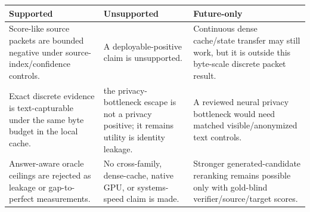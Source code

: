 \documentclass{article}
\begin{document}
\begingroup\small
\begin{longtable}[]{@{}lll@{}}
\toprule
\begin{minipage}[b]{0.30\columnwidth}\raggedright
Supported\strut
\end{minipage} & \begin{minipage}[b]{0.30\columnwidth}\raggedright
Unsupported\strut
\end{minipage} & \begin{minipage}[b]{0.30\columnwidth}\raggedright
Future-only\strut
\end{minipage}\tabularnewline
\midrule
\endhead
\begin{minipage}[t]{0.30\columnwidth}\raggedright
Score-like source packets are bounded negative under
source-index/confidence controls.\strut
\end{minipage} & \begin{minipage}[t]{0.30\columnwidth}\raggedright
A deployable-positive claim is unsupported.\strut
\end{minipage} & \begin{minipage}[t]{0.30\columnwidth}\raggedright
Continuous dense cache/state transfer may still work, but it is outside
this byte-scale discrete packet result.\strut
\end{minipage}\tabularnewline
\begin{minipage}[t]{0.30\columnwidth}\raggedright
Exact discrete evidence is text-capturable under the same byte budget in
the local cache.\strut
\end{minipage} & \begin{minipage}[t]{0.30\columnwidth}\raggedright
the privacy-bottleneck escape is not a privacy positive; it remains
utility is identity leakage.\strut
\end{minipage} & \begin{minipage}[t]{0.30\columnwidth}\raggedright
A reviewed neural privacy bottleneck would need matched
visible/anonymized text controls.\strut
\end{minipage}\tabularnewline
\begin{minipage}[t]{0.30\columnwidth}\raggedright
Answer-aware oracle ceilings are rejected as leakage or gap-to-perfect
measurements.\strut
\end{minipage} & \begin{minipage}[t]{0.30\columnwidth}\raggedright
No cross-family, dense-cache, native GPU, or systems-speed claim is
made.\strut
\end{minipage} & \begin{minipage}[t]{0.30\columnwidth}\raggedright
Stronger generated-candidate reranking remains possible only with
gold-blind verifier/source/target scores.\strut
\end{minipage}\tabularnewline
\bottomrule
\end{longtable}
\endgroup
\end{document}
